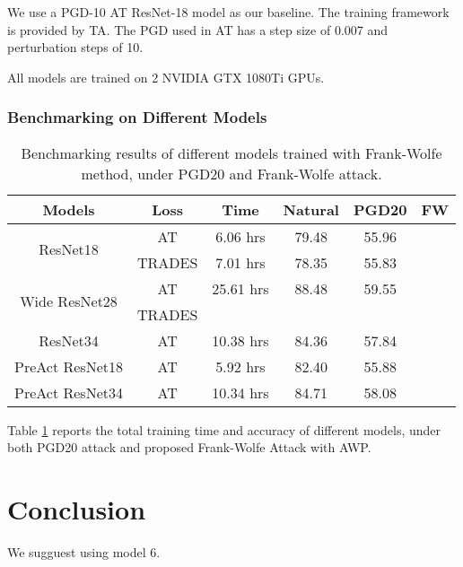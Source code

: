 \documentclass{article}
\begin{document}
            We use a PGD-10 AT ResNet-18 model as our baseline. The training framework is provided by TA. The PGD used in AT has a step size of 0.007 and perturbation steps of 10. 

            All models are trained on 2 NVIDIA GTX 1080Ti GPUs.

        \subsubsection{Benchmarking on Different Models}\label{subs:DefenseModelBenchmarking}
            \begin{table}[h]
                \centering
                \begin{tabular}{cccccc}
                    \hline
                    Models                         & Loss   & Time      & Natural & PGD20 & FW \\ \hline
                    \multirow{2}{*}{ResNet18}      & AT     & 6.06 hrs  & 79.48   & 55.96 &    \\
                                                   & TRADES & 7.01 hrs  & 78.35   & 55.83 &    \\ \hline
                    \multirow{2}{*}{Wide ResNet28} & AT     & 25.61 hrs & 88.48   & 59.55 &    \\
                                                   & TRADES &           &         &       &    \\ \hline
                    ResNet34                       & AT     & 10.38 hrs & 84.36   & 57.84 &    \\ \hline
                    PreAct ResNet18                & AT     & 5.92 hrs  & 82.40   & 55.88 &    \\ \hline
                    PreAct ResNet34                & AT     & 10.34 hrs & 84.71   & 58.08 &    \\ \hline
                \end{tabular}
                \caption{Benchmarking results of different models trained with Frank-Wolfe method, under PGD20 and Frank-Wolfe attack.}
                \label{table:DefenseBenchmarkingResults}
            \end{table}
            Table \ref{table:DefenseBenchmarkingResults} reports the total training time and accuracy of different models, under both PGD20 attack and proposed Frank-Wolfe Attack with AWP.



\section{Conclusion}\label{sec:Conclusion}
We sugguest using model 6.
\end{document}
